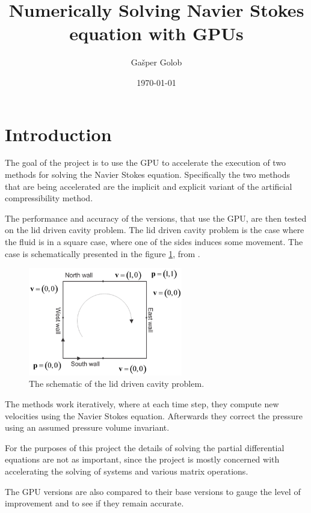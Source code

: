 \documentclass{article}
\title{Numerically Solving Navier Stokes equation with GPUs}
\author{Gašper Golob}
\date{\today}
\begin{document}
\maketitle

\section{Introduction}
The goal of the project is to use the GPU to accelerate the execution of two methods for 
solving the Navier Stokes equation. Specifically the two methods that are being accelerated are
the implicit and explicit variant of the artificial compressibility method.

The performance and accuracy of the versions, that use the GPU, are then tested on the 
lid driven cavity problem. The lid driven cavity problem is the case where the fluid is in 
a square case, where one of the sides induces some movement. 
The case is schematically presented in the figure \ref{fig:lid_driven_cavity}, 
from \cite{lidDriven}.
\begin{figure}[h!] 
    \centering 
    \includegraphics[width=0.6\textwidth]{lid_driven_cavity.png} 
    \caption{The schematic of the lid driven cavity problem.} 
    \label{fig:lid_driven_cavity} 
\end{figure}

The methods work iteratively, where at each time step, they compute new velocities using the 
Navier Stokes equation. Afterwards they correct the pressure using an assumed pressure volume 
invariant. 

For the purposes of this project the details of solving the partial differential equations are not 
as important, since the project is mostly concerned with accelerating the solving of systems and 
various matrix operations.

The GPU versions are also compared to their base versions to gauge the level of improvement and to 
see if they remain accurate.
\end{document}
